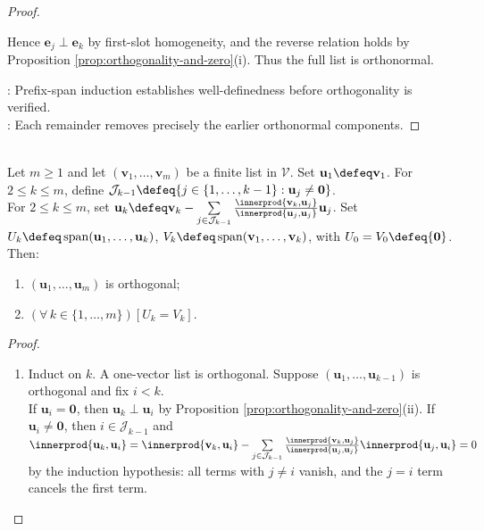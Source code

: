 \begin{theorem}
\begin{proof}
\begin{enumerate}[label=(\roman*)]
Hence $\mathbf{e}_j\perp\mathbf{e}_k$ by first-slot homogeneity, and the reverse relation holds by Proposition \ref{prop:orthogonality-and-zero}(i). Thus the full list is orthonormal.
\end{enumerate}
: Prefix-span induction establishes well-definedness before orthogonality is verified.\\
: Each remainder removes precisely the earlier orthonormal components.
\end{proof}
\end{theorem}

\begin{theorem} \label{thm:gram-schmidt-arbitrary-list} \\
Let $m\geq1$ and let $(\mathbf{v}_1,\ldots,\mathbf{v}_m)$ be a finite list in $\mathcal{V}$. Set $\mathbf{u}_1\defeq\mathbf{v}_1$. For $2\leq k\leq m$, define $\mathcal{J}_{k-1}\defeq\{j\in\{1,\ldots,k-1\}:\mathbf{u}_j\neq\mathbf{0}\}$.\\
For $2\leq k\leq m$, set $\mathbf{u}_k\defeq\mathbf{v}_k-\sum\limits_{j\in\mathcal{J}_{k-1}}\frac{\innerprod{\mathbf{v}_k,\mathbf{u}_j}}{\innerprod{\mathbf{u}_j,\mathbf{u}_j}}\mathbf{u}_j$. Set $U_k\defeq\operatorname{span}(\mathbf{u}_1,\ldots,\mathbf{u}_k)$, $V_k\defeq\operatorname{span}(\mathbf{v}_1,\ldots,\mathbf{v}_k)$, with $U_0=V_0\defeq\{\mathbf{0}\}$. Then:
\begin{enumerate}[label=(\roman*)]
\setlength{\itemsep}{0pt}
\item $(\mathbf{u}_1,\ldots,\mathbf{u}_m)$ is orthogonal;
\item $(\forall\,k\in\{1,\ldots,m\})[U_k=V_k]$.
\end{enumerate}
\begin{proof}
\begin{enumerate}[label=(\roman*)]
\setlength{\itemsep}{0pt}
\item[$(i)$] Induct on $k$. A one-vector list is orthogonal. Suppose $(\mathbf{u}_1,\ldots,\mathbf{u}_{k-1})$ is orthogonal and fix $i<k$.\\
If $\mathbf{u}_i=\mathbf{0}$, then $\mathbf{u}_k\perp\mathbf{u}_i$ by Proposition \ref{prop:orthogonality-and-zero}(ii). If $\mathbf{u}_i\neq\mathbf{0}$, then $i\in\mathcal{J}_{k-1}$ and $\innerprod{\mathbf{u}_k,\mathbf{u}_i}=\innerprod{\mathbf{v}_k,\mathbf{u}_i}-\sum\limits_{j\in\mathcal{J}_{k-1}}\frac{\innerprod{\mathbf{v}_k,\mathbf{u}_j}}{\innerprod{\mathbf{u}_j,\mathbf{u}_j}}\innerprod{\mathbf{u}_j,\mathbf{u}_i}=0$ by the induction hypothesis: all terms with $j\neq i$ vanish, and the $j=i$ term cancels the first term.\\

\end{enumerate}
\end{proof}
\end{theorem}

